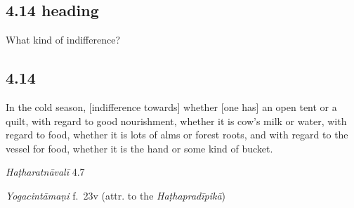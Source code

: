 \begin{ekdosis}
\begin{testimonia}[hp04_013]
\end{testimonia}


\subsection*{4.14 heading}
\begin{translation}[hp04_014a]
What kind of indifference?
\end{translation}


\subsection*{4.14}
\begin{translation}[hp04_014]
In the cold season, [indifference towards] whether [one has] an open tent or a quilt, with regard to good nourishment, whether it is cow's milk or water, with regard to food, whether it is lots of alms or forest roots, and with regard to the vessel for food, whether it is the hand or some kind of bucket.
%
\end{translation}


\begin{testimonia}[hp04_014]
\emph{Haṭharatnāvalī} 4.7
\begin{versinnote}
\end{versinnote}

\emph{Yogacintāmaṇi} f.~23v (attr. to the \emph{Haṭhapradīpikā})
\begin{versinnote}
\end{versinnote}


\end{testimonia}
\end{ekdosis}
